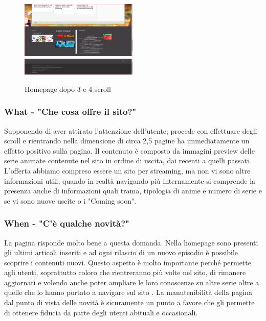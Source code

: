 \begin{figure}[H]
	\includegraphics[width=0.5\textwidth]{img/homepage04.png}
	\includegraphics[width=0.5\textwidth]{img/homepage05.png}
	\caption{Homepage dopo 3 e 4 scroll} 
	\label{img3} 
\end{figure}

\subsubsection{What - "Che cosa offre il sito?"} \label{HWhat}
Supponendo di aver attirato l'attenzione dell'utente; procede con effettuare degli scroll e rientrando nella dimensione di circa 2,5 pagine ha immediatamente un effetto positivo sulla pagina. Il contenuto è composto da immagini preview delle serie animate contenute nel sito in ordine di uscita, dai recenti a quelli passati. L'offerta abbiamo compreso essere un sito per streaming, ma non vi sono altre informazioni utili, quando in realtà navigando più internamente si comprende la presenza anche di informazioni quali trama, tipologia di anime e numero di serie e se vi sono nuove uscite o i "Coming soon".

\subsubsection{When - "C'è qualche novità?"} \label{HWhen}
La pagina risponde molto bene a questa domanda. Nella homepage sono presenti gli ultimi articoli inseriti e ad ogni rilascio di un nuovo episodio è possibile scoprire i contenuti nuovi.
Questo aspetto è molto importante perché permette agli utenti, soprattutto coloro che rientreranno più volte nel sito, di rimanere aggiornati e volendo anche poter ampliare le loro conoscenze su altre serie oltre a quelle che lo hanno portato a navigare sul sito \nomeSito. La manutenibilità della pagina dal punto di vista delle novità è sicuramente un punto a favore che gli permette di ottenere fiducia da parte degli utenti abituali e occasionali.


